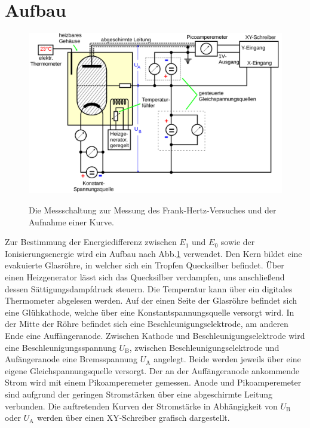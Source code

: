 \section{Aufbau}
\label{sec:Aufbau}

\begin{figure}
 \centering
 \caption{Die Messschaltung zur Messung des Frank-Hertz-Versuches und der Aufnahme einer Kurve.}
 \includegraphics[width=\linewidth-70pt,height=\textheight-70pt,keepaspectratio]{content/Frankpraxis.png}
 \label{fig:frankpraxis}
\end{figure}

Zur Bestimmung der Energiedifferenz zwischen $E_1$ und $E_0$ sowie der Ionisierungsenergie
wird ein Aufbau nach Abb.\ref{fig:frankpraxis} verwendet. Den Kern bildet eine evakuierte Glasröhre,
in welcher sich ein Tropfen Quecksilber befindet. Über einen Heizgenerator lässt
sich das Quecksilber verdampfen, uns anschließend dessen Sättigungsdampfdruck steuern. Die
Temperatur kann über ein digitales Thermometer abgelesen werden. Auf der einen Seite
der Glasröhre befindet sich eine Glühkathode, welche über eine Konstantspannungsquelle
versorgt wird. In der Mitte der Röhre befindet sich eine Beschleunigungselektrode,
am anderen Ende eine Auffängeranode. Zwischen Kathode und Beschleunigungselektrode
wird eine Beschleunigungsspannung $U_\text{B}$, zwischen Beschleunigungselektrode
und Aufängeranode eine Bremsspannung $U_\text{A}$ angelegt. Beide werden jeweils über eine
eigene Gleichspannungsquelle versorgt. Der an der Auffängeranode ankommende Strom
wird mit einem Pikoamperemeter gemessen. Anode und Pikoamperemeter sind aufgrund der geringen Stromstärken
über eine abgeschirmte Leitung verbunden. Die auftretenden Kurven der Stromstärke in Abhängigkeit 
von $U_\text{B}$ oder $U_\text{A}$ werden über einen XY-Schreiber grafisch dargestellt.
